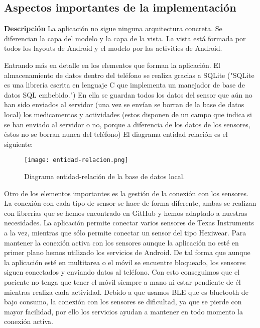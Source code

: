 \subsection{Aspectos importantes de la implementación}
{\bf Descripción}
\newline
\newline
La aplicación no sigue ninguna arquitectura concreta. Se diferencian la capa del modelo y la capa de la vista. La vista está formada por todos los layouts de Android y el modelo por las activities de Android.
\newline

Entrando más en detalle en los elementos que forman la aplicación. El almacenamiento de datos dentro del teléfono se realiza gracias a SQLite ("SQLite es una librería escrita en lenguaje C que implementa un manejador de base de datos SQL embebido.") En ella se guardan todos los datos del sensor que aún no han sido enviados al servidor (una vez se envían se borran de la base de datos local) los medicamentos y actividades (estos disponen de un campo que indica si se han enviado al servidor o no, porque a diferencia de los datos de los sensores, éstos no se borran nunca del teléfono) El diagrama entidad relación es el siguiente:
\newline

\begin{figure}[h!]
\centering
\texttt{[image: entidad-relacion.png]}
\caption{Diagrama entidad-relación de la base de datos local.}
\end{figure}

Otro de los elementos importantes es la gestión de la conexión con los sensores. La conexión con cada tipo de sensor se hace de forma diferente, ambas se realizan con librerías que se hemos encontrado en GitHub y hemos adaptado a nuestras necesidades. La aplicación permite conectar varios sensores de Texas Instruments a la vez, mientras que sólo permite conectar un sensor del tipo Hexiwear. Para mantener la conexión activa con los sensores aunque la aplicación no esté en primer plano hemos utilizado los servicios de Android. De tal forma que aunque la aplicación esté en multitarea o el móvil se encuentre bloqueado, los sensores siguen conectados y enviando datos al teléfono. Con esto conseguimos que el paciente no tenga que tener el móvil siempre a mano ni estar pendiente de él mientras realiza cada actividad. Debido a que usamos BLE que es bluetooth de bajo consumo, la conexión con los sensores se dificultad, ya que se pierde con mayor facilidad, por ello los servicios ayudan a mantener en todo momento la conexión activa.
\newline

